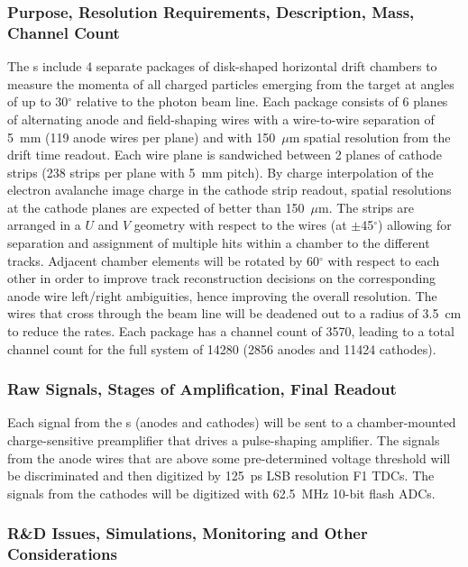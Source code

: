 \subsubsection*{Purpose, Resolution Requirements, Description, Mass, Channel Count}

The \fdc{}s include 4 separate packages of disk-shaped horizontal drift chambers 
to measure the momenta of all charged particles emerging from the target at 
angles of up to 30$^{\circ}$ relative to the photon beam line.  Each package
consists of 6 planes of alternating anode and field-shaping wires with a 
wire-to-wire separation of 5~mm (119 anode wires per plane) and with 150~$\mu$m 
spatial resolution from the drift time readout.  Each wire plane is sandwiched 
between 2 planes of cathode strips (238 strips per plane with 5~mm pitch).  By 
charge interpolation of the electron avalanche image charge in the cathode strip 
readout, spatial resolutions at the cathode planes are expected of better than 
150~$\mu$m.  The strips are arranged in a $U$ and $V$ geometry with respect to 
the wires (at $\pm$45$^{\circ}$) allowing for separation and assignment of 
multiple hits within a chamber to the different tracks.  Adjacent chamber 
elements will be rotated by 60$^{\circ}$ with respect to each other in order 
to improve track reconstruction decisions on the corresponding anode wire 
left/right ambiguities, hence improving the overall resolution.  The wires 
that cross through the beam line will be deadened out to a radius of 3.5~cm 
to reduce the rates.  Each \fdc{} package has a channel count of 3570, leading 
to a total channel count for the full \fdc{} system of 14280 (2856 anodes and
11424 cathodes).

\subsubsection*{Raw Signals, Stages of Amplification, Final Readout}

Each signal from the \fdc{}s (anodes and cathodes) will be sent to a
chamber-mounted charge-sensitive preamplifier that drives a pulse-shaping 
amplifier. The signals from the anode wires that are above some 
pre-determined voltage threshold will be discriminated and then digitized 
by 125~ps LSB resolution F1 TDCs.  The signals from the cathodes will be digitized with 
62.5~MHz 10-bit flash ADCs.

\subsubsection*{R\&D Issues, Simulations, Monitoring and Other Considerations}

